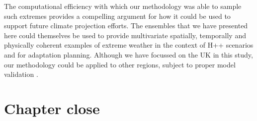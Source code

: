   The computational efficiency with which our methodology was able to sample such extremes provides a compelling argument for how it could be used to support future climate projection efforts. The ensembles that we have presented here could themselves be used to provide  multivariate spatially, temporally and physically coherent examples of extreme weather in the context of H++ scenarios and for adaptation planning. Although we have focussed on the UK in this study, our methodology could be applied to other regions, subject to proper model validation \citep{murphy_ukcp18_2018,watson_multi-thousand_2020}.
  
\section{Chapter close}

